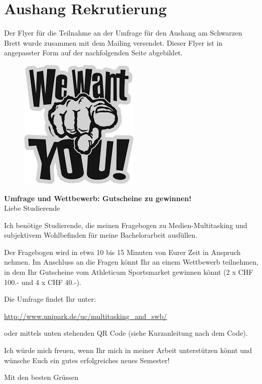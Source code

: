 \section{Aushang Rekrutierung}\label{chap.appendix_aushang}

Der Flyer für die Teilnahme an der Umfrage für den Aushang am Schwarzen Brett wurde zusammen mit dem Mailing versendet. Dieser Flyer ist in angepasster Form auf der nachfolgenden Seite abgebildet. \newpage
\begin{figure}
    \centering
    \includegraphics[scale=0.5]{images/anhang/WeWantYou.jpeg}
\end{figure}
\textbf{Umfrage und Wettbewerb: Gutscheine zu gewinnen!}\\
Liebe Studierende

Ich benötige Studierende, die meinen Fragebogen zu Medien-Multitasking und subjektivem Wohlbefinden für meine Bachelorarbeit ausfüllen.

Der Fragebogen wird in etwa 10 bis 15 Minuten von Eurer Zeit in Anspruch nehmen. Im Anschluss an die Fragen könnt Ihr an einem Wettbewerb teilnehmen, in dem Ihr Gutscheine vom Athleticum Sportsmarket gewinnen könnt (2 x CHF 100.- und 4 x CHF 40.-).

Die Umfrage findet Ihr unter:

\url{http://www.unipark.de/uc/multitasking_and_swb/}

oder mittels unten stehenden QR Code (siehe Kurzanleitung nach dem Code).

Ich würde mich freuen, wenn Ihr mich in meiner Arbeit unterstützen könnt und wünsche Euch ein gutes erfolgreiches neues Semester!

Mit den besten Grüssen

